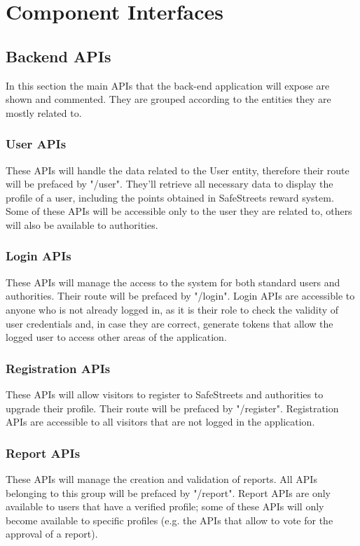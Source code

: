 \section{Component Interfaces}

\subsection{Backend APIs}
In this section the main APIs that the back-end application will expose are shown and commented. They are grouped according to the entities they are mostly related to.

\subsubsection{User APIs}
These APIs will handle the data related to the User entity, therefore their route will be prefaced by "/user". They'll retrieve all necessary data to display the profile of a user, including the points obtained in SafeStreets reward system. Some of these APIs will be accessible only to the user they are related to, others will also be available to authorities.

\subsubsection{Login APIs}
These APIs will manage the access to the system for both standard users and authorities. Their route will be prefaced by "/login". Login APIs are accessible to anyone who is not already logged in, as it is their role to check the validity of user credentials and, in case they are correct, generate tokens that allow the logged user to access other areas of the application.

\subsubsection{Registration APIs}
These APIs will allow visitors to register to SafeStreets and authorities to upgrade their profile. Their route will be prefaced by "/register". Registration APIs are accessible to all visitors that are not logged in the application.

\subsubsection{Report APIs}
These APIs will manage the creation and validation of reports. All APIs belonging to this group will be prefaced by "/report". Report APIs are only available to users that have a verified profile; some of these APIs will only become available to specific profiles (e.g. the APIs that allow to vote for the approval of a report).

